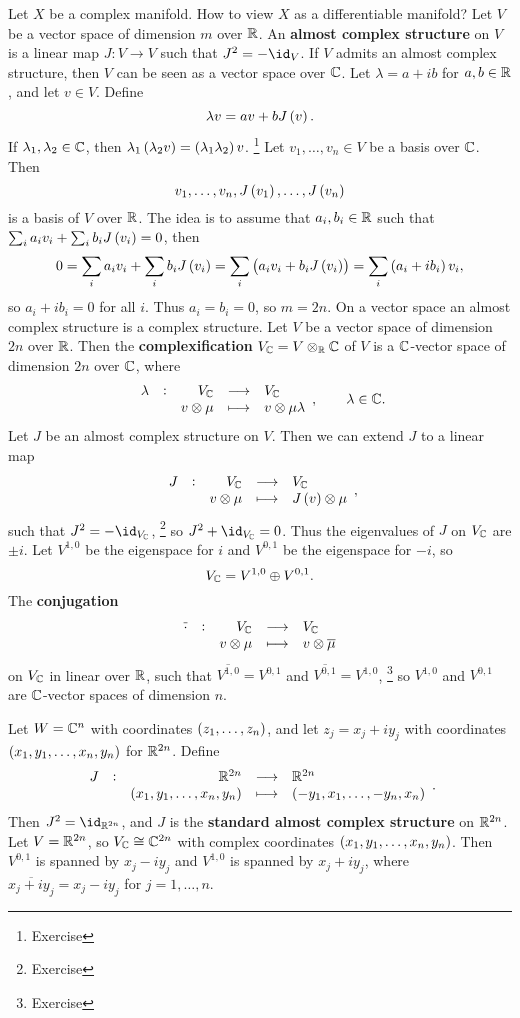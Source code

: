 Let $ X $ be a complex manifold. How to view $ X $ as a differentiable manifold? Let $ V $ be a vector space of dimension $ m $ over $ \mathbb{R} $. An \textbf{almost complex structure} on $ V $ is a linear map $ J : V \to V $ such that $ J^2 = -\id_V $. If $ V $ admits an almost complex structure, then $ V $ can be seen as a vector space over $ \mathbb{C} $. Let $ \lambda = a + ib $ for $ a, b \in \mathbb{R} $, and let $ v \in V $. Define
$$ \lambda v = av + bJ\br{v}. $$
If $ \lambda_1, \lambda_2 \in \mathbb{C} $, then $ \lambda_1\br{\lambda_2 v} = \br{\lambda_1\lambda_2}v $. \footnote{Exercise} Let $ v_1, \dots, v_n \in V $ be a basis over $ \mathbb{C} $. Then
$$ v_1, \dots, v_n, J\br{v_1}, \dots, J\br{v_n} $$
is a basis of $ V $ over $ \mathbb{R} $. The idea is to assume that $ a_i, b_i \in \mathbb{R} $ such that $ \sum_i a_iv_i + \sum_i b_iJ\br{v_i} = 0 $, then
$$ 0 = \sum_i a_iv_i + \sum_i b_iJ\br{v_i} = \sum_i \br{a_iv_i + b_iJ\br{v_i}} = \sum_i \br{a_i + ib_i}v_i, $$
so $ a_i + ib_i = 0 $ for all $ i $. Thus $ a_i = b_i = 0 $, so $ m = 2n $. On a vector space an almost complex structure is a complex structure. Let $ V $ be a vector space of dimension $ 2n $ over $ \mathbb{R} $. Then the \textbf{complexification} $ V_{\mathbb{C}} = V \otimes_{\mathbb{R}} \mathbb{C} $ of $ V $ is a $ \mathbb{C} $-vector space of dimension $ 2n $ over $ \mathbb{C} $, where
$$ \function[\lambda]{V_\CC}{V_\CC}{v \otimes \mu}{v \otimes \mu\lambda}, \qquad \lambda \in \CC. $$
Let $ J $ be an almost complex structure on $ V $. Then we can extend $ J $ to a linear map
$$ \function[J]{V_\CC}{V_\CC}{v \otimes \mu}{J\br{v} \otimes \mu}, $$
such that $ J^2 = -\id_{V_\CC} $, \footnote{Exercise} so $ J^2 + \id_{V_\CC} = 0 $. Thus the eigenvalues of $ J $ on $ V_{\mathbb{C}} $ are $ \pm i $. Let $ V^{1, 0} $ be the eigenspace for $ i $ and $ V^{0, 1} $ be the eigenspace for $ -i $, so
$$ V_{\mathbb{C}} = V^{1, 0} \oplus V^{0, 1}. $$
The \textbf{conjugation}
$$ \function[\overline{\cdot}]{V_\CC}{V_\CC}{v \otimes \mu}{v \otimes \overline{\mu}} $$
on $ V_{\mathbb{C}} $ in linear over $ \mathbb{R} $, such that $ \overline{V^{1, 0}} = V^{0, 1} $ and $ \overline{V^{0, 1}} = V^{1, 0} $, \footnote{Exercise} so $ V^{1, 0} $ and $ V^{0, 1} $ are $ \mathbb{C} $-vector spaces of dimension $ n $.

\pagebreak

\begin{example}
Let $ W = \mathbb{C}^n $ with coordinates $ \br{z_1, \dots, z_n} $, and let $ z_j = x_j + iy_j $ with coordinates $ \br{x_1, y_1, \dots, x_n, y_n} $ for $ \mathbb{R}^{2n} $. Define
$$ \function[J]{\RR^{2n}}{\RR^{2n}}{\br{x_1, y_1, \dots, x_n, y_n}}{\br{-y_1, x_1, \dots, -y_n, x_n}}. $$
Then $ J^2 = \id_{\RR^{2n}} $, and $ J $ is the \textbf{standard almost complex structure} on $ \mathbb{R}^{2n} $. Let $ V = \mathbb{R}^{2n} $, so $ V_{\mathbb{C}} \cong \mathbb{C}^{2n} $ with complex coordinates $ \br{x_1, y_1, \dots, x_n, y_n} $. Then $ V^{0, 1} $ is spanned by $ x_j - iy_j $ and $ V^{1, 0} $ is spanned by $ x_j + iy_j $, where $ \overline{x_j + iy_j} = x_j - iy_j $ for $ j = 1, \dots, n $.
\end{example}

